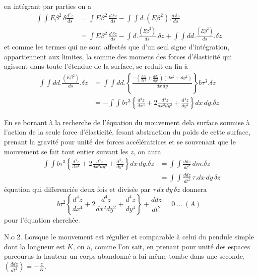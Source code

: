 \documentclass[11pt,a4paper]{article}
\begin{document}
en intégrant par parties on a
\begin{align*}
\int\!\!\int E\beta^2\,\delta\frac{d^2z}{ds} &= \int E\beta^2\,\frac{d\,\delta z}{ds} - \int\!\!\int d.(E\beta^2).\frac{d\,\delta z}{ds}\\
&= \int E\beta^2\,\frac{d\,\delta z}{ds} - \int d.\frac{(E\beta^2)}{ds}.\delta z + \int\!\!\int dd.\frac{(E\beta^2)}{ds}.\delta z
\end{align*}
et comme les termes qui ne sont affectés que d'un seul signe
d'intégration, appartiennent aux limites, la somme des momens
des forces d'élasticité qui agissent dans toute l'étendue de
la surface, se reduit en fin à
\begin{align*}
\int\!\!\int dd.\frac{(E\beta^2)}{ds}.\delta z &= \int\!\!\int dd.\left\{\frac{-\left(\frac{ddz}{dx^2}+\frac{ddz}{dy^2}\right)(dx^2+dy^2)}{dx\,dy}\right\}b\tau^3.\delta z\\
&= -\int\!\!\int b\tau^3\left\{\frac{d^4z}{dx^4}+2\frac{d^4z}{dx^2dy^2}+\frac{d^4z}{dy^4}\right\}dx\,dy.\delta z
\end{align*}

En se bornant à la recherche de l'équation du mouvement
dela surface soumise à l'action de la seule force d'élasticité,
fesant abstraction du poids de cette surface, prenant la gravité
pour unité des forces accélératrices et se souvenant que le
mouvement se fait tout entier suivant les $z$, on aura
\begin{align*}
-\int\!\!\int b\tau^3\left\{\frac{d^4z}{dx^4}+2\frac{d^4z}{dx^2dy^2}+\frac{d^4z}{dy^4}\right\}dx\,dy.\delta z &= \int\!\!\int\frac{ddz}{dt^2}\,dm.\delta z\\
&= \int\!\!\int\frac{ddz}{dt^2}\,\tau.dx\,dy\,\delta z
\end{align*}
équation qui differenciée deux fois et divisée par $\tau\,dx\,dy\,\delta z$
donnera
\[ b\tau^2\left\{\frac{d^4z}{dx^4}+2\frac{d^4z}{dx^2dy^2}+\frac{d^4z}{dy^4}\right\}+\frac{ddz}{dt^2} = 0\ \ldots\ (A) \]
pour l'équation cherchée.

N.o 2. Lorsque le mouvement est régulier et comparable à
celui du pendule simple dont la longueur est $K$, on a,
comme l'on sait, en prenant pour unité des espaces parcourus
la hauteur   un corps abandonné a lui même
tombe dans une seconde, $\left(\frac{ddz}{dt^2}\right) = -\frac{z}{K}$.
\end{document}

